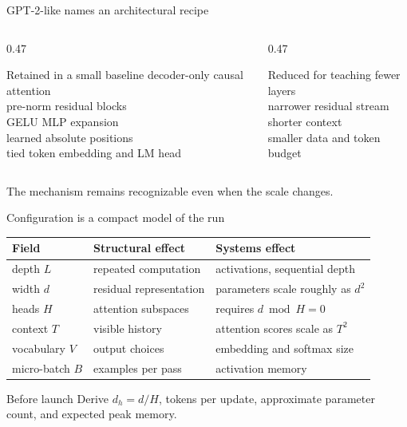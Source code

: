 \documentclass[handout]{beamer}
\begin{document}
\begin{frame}{GPT-2-like names an architectural recipe}
  \begin{columns}[t]
    \begin{column}{0.47\linewidth}
      \begin{block}{Retained in a small baseline}
        decoder-only causal attention\\pre-norm residual blocks\\GELU MLP expansion\\learned absolute positions\\tied token embedding and LM head
      \end{block}
    \end{column}
    \begin{column}{0.47\linewidth}
      \begin{alertblock}{Reduced for teaching}
        fewer layers\\narrower residual stream\\shorter context\\smaller data and token budget
      \end{alertblock}
    \end{column}
  \end{columns}
  \vfill
  \centering The mechanism remains recognizable even when the scale changes.
\end{frame}

\begin{frame}{Configuration is a compact model of the run}
  \small
  \begin{tabular}{@{}>{\raggedright\arraybackslash}p{.19\linewidth}>{\raggedright\arraybackslash}p{.31\linewidth}>{\raggedright\arraybackslash}p{.39\linewidth}@{}}
    \toprule
    Field & Structural effect & Systems effect \\
    \midrule
    depth $L$ & repeated computation & activations, sequential depth \\
    width $d$ & residual representation & parameters scale roughly as $d^2$ \\
    heads $H$ & attention subspaces & requires $d\bmod H=0$ \\
    context $T$ & visible history & attention scores scale as $T^2$ \\
    vocabulary $V$ & output choices & embedding and softmax size \\
    micro-batch $B$ & examples per pass & activation memory \\
    \bottomrule
  \end{tabular}
  \vfill
  \begin{alertblock}{Before launch}
    Derive $d_h=d/H$, tokens per update, approximate parameter count, and expected peak memory.
  \end{alertblock}
\end{frame}
\end{document}

